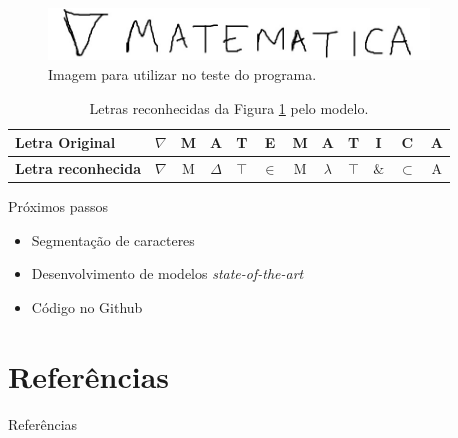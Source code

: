 \documentclass{beamer}
\begin{document}
    \begin{frame}
        \begin{figure}[htb]
            \centering
            \includegraphics[width=0.9\textwidth]{TesteMat.png}
            \caption{Imagem para utilizar no teste do programa.}
            \label{fig:nabmat}
        \end{figure}
        
        \begin{table}[htb]
            \centering
            \caption{Letras reconhecidas da Figura \ref{fig:nabmat} pelo modelo.}
            \label{tab:nabmat}
            \begin{adjustbox}{max width=\textwidth}
            \begin{tabular}{@{}lccccccccccc@{}}
                \toprule
                \textbf{Letra Original}    & $\nabla$ & M & A        & T      & E     & M & A         & T      & I    & C         & A \\ \midrule
                \textbf{Letra reconhecida} & $\nabla$ & M & $\Delta$ & $\top$ & $\in$ & M & $\lambda$ & $\top$ & $\&$ & $\subset$ & A \\ \bottomrule
            \end{tabular}
            \end{adjustbox}
        \end{table}
    \end{frame}
    
    \begin{frame}{Próximos passos}
        \begin{itemize}
            \item Segmentação de caracteres
            \item Desenvolvimento de modelos \emph{state-of-the-art}
            \item Código no Github
        \end{itemize}
    \end{frame}
    
\section{Referências}
    \begin{frame}[allowframebreaks]{Referências}
        \nocite{thomadata,tensorflow2015,zhang,elzad,nocedal,shai, ng,mitchell,wfan,julia,github,burfa,adam,bajmes,tensorflow2015}
        \printbibliography[heading=none]
    \end{frame}
    
   
\end{document}
